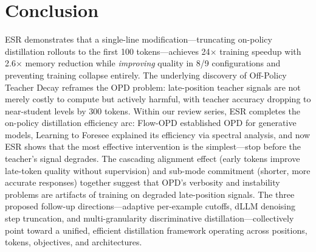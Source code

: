 \documentclass[11pt,a4paper]{article}
\begin{document}
\section*{Conclusion}

ESR demonstrates that a single-line modification---truncating on-policy distillation rollouts to the first 100 tokens---achieves 24$\times$ training speedup with 2.6$\times$ memory reduction while \emph{improving} quality in 8/9 configurations and preventing training collapse entirely. The underlying discovery of Off-Policy Teacher Decay reframes the OPD problem: late-position teacher signals are not merely costly to compute but actively harmful, with teacher accuracy dropping to near-student levels by 300 tokens. Within our review series, ESR completes the on-policy distillation efficiency arc: Flow-OPD established OPD for generative models, Learning to Foresee explained its efficiency via spectral analysis, and now ESR shows that the most effective intervention is the simplest---stop before the teacher's signal degrades. The cascading alignment effect (early tokens improve late-token quality without supervision) and sub-mode commitment (shorter, more accurate responses) together suggest that OPD's verbosity and instability problems are artifacts of training on degraded late-position signals. The three proposed follow-up directions---adaptive per-example cutoffs, dLLM denoising step truncation, and multi-granularity discriminative distillation---collectively point toward a unified, efficient distillation framework operating across positions, tokens, objectives, and architectures.
\end{document}
